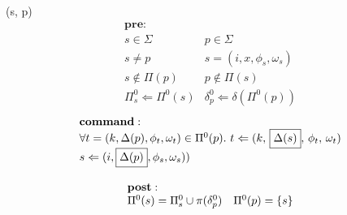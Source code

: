 \documentclass[10pt]{article}
\begin{document}
(s, p)\\
\[
\begin{array}{ll}
\mathbf{pre}:\\
   s \in \Sigma & p \in \Sigma\\
   s \neq p & s = (i, x, \phi_s, \omega_s)\\
   s \notin \Pi(p)  & p \notin \Pi(s)\\
   \Pi^0_s \Leftarrow \Pi^0(s) & \delta^0_p \Leftarrow \delta(\Pi^0(p))
\end{array}
\]
\[
\begin{array}{l}
   \mathbf{command}:\\
   \forall t = (k, \Delta(p), \phi_t, \omega_t) \in \Pi^0(p).\ t \Leftarrow (k,\,\fbox{$\Delta(s)$},\,\phi_t,\, \omega_t)\\
   s \Leftarrow (i, \fbox{$\Delta(p)$}, \phi_s, \omega_s))
\end{array}
\]
\[
\begin{array}{ll}
\rule{0mm}{5mm}
   \mathbf{post}:\\
   \Pi^0(s) = \Pi^0_s \cup \pi(\delta^0_p)  & \Pi^0(p) = \{ s \}\\
\end{array}
\]
\end{document}
